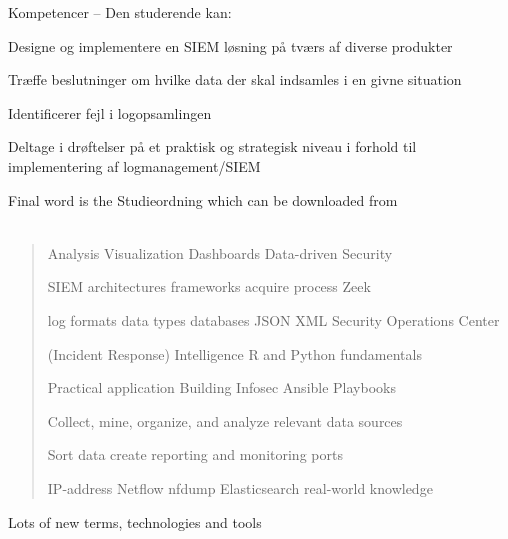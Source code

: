 \documentclass[Screen16to9,17pt]{foils}
\begin{document}
Kompetencer -- Den studerende kan:
\begin{list2}
\item Designe og implementere en SIEM løsning på tværs af diverse produkter
\item Træffe beslutninger om hvilke data der skal indsamles i en givne situation
\item Identificerer fejl i logopsamlingen
\item Deltage i drøftelser på et praktisk og strategisk niveau i forhold til implementering af
logmanagement/SIEM
\end{list2}

Final word is the Studieordning which can be downloaded from\\
{\footnotesize {}\\
}



\begin{quote}\Large
Analysis Visualization Dashboards Data-driven Security

SIEM architectures frameworks acquire process Zeek

log formats data types databases JSON XML Security Operations Center

(Incident Response) Intelligence R and Python fundamentals

Practical application Building Infosec \hskip 1cm Ansible Playbooks

Collect, mine, organize, and analyze relevant data sources

Sort data create reporting and monitoring ports

IP-address Netflow nfdump Elasticsearch real-world knowledge
\end{quote}

\begin{list2}
\item Lots of new terms, technologies and tools
\end{list2}


\end{document}
